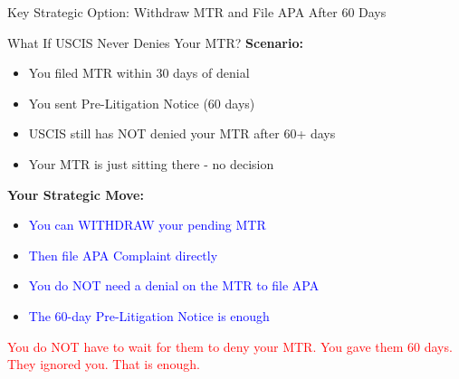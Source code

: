 \documentclass[11pt]{beamer}
\begin{document}
	
	\begin{frame}{Key Strategic Option: Withdraw MTR and File APA After 60 Days}
		\scriptsize
		\begin{block}{What If USCIS Never Denies Your MTR?}
			\textbf{Scenario:}
			\begin{itemize}
				\item You filed MTR within 30 days of denial
				\item You sent Pre-Litigation Notice (60 days)
				\item USCIS still has NOT denied your MTR after 60+ days
				\item Your MTR is just sitting there - no decision
			\end{itemize}
			\textbf{Your Strategic Move:}
			\begin{itemize}
				\item \textcolor{blue}{You can WITHDRAW your pending MTR}
				\item \textcolor{blue}{Then file APA Complaint directly}
				\item \textcolor{blue}{You do NOT need a denial on the MTR to file APA}
				\item \textcolor{blue}{The 60-day Pre-Litigation Notice is enough}
			\end{itemize}
			\textcolor{red}{You do NOT have to wait for them to deny your MTR.}
			\textcolor{red}{You gave them 60 days. They ignored you. That is enough.}
		\end{block}
	\end{frame}
	
\end{document}
